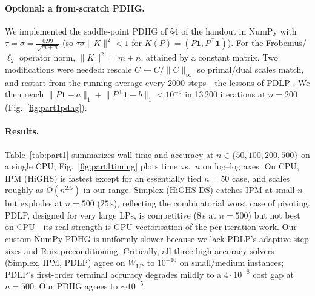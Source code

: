 \documentclass{article}
\begin{document}
\paragraph{Optional: a from-scratch PDHG.}
We implemented the saddle-point PDHG of \S4 of the handout in NumPy
with $\tau\!=\!\sigma\!=\!\tfrac{0.99}{\sqrt{m+n}}$ (so
$\tau\sigma\|K\|^2\!<\!1$ for $K(P)\!=\!(P\mathbf 1, P^{\!\top}\!\mathbf 1)$).
For the Frobenius/$\ell_2$ operator norm, $\|K\|^2\!=\!m+n$, attained
by a constant matrix.  Two modifications were needed: rescale
$C\!\leftarrow\!C/\|C\|_\infty$ so primal/dual scales match, and
restart from the running average every 2000 steps---the lessons of
PDLP \cite{applegate2021pdlp,lu2025overview}.  We then reach
$\|P\mathbf 1\!-\!a\|_1\!+\!\|P^\top\mathbf 1\!-\!b\|_1\!<\!10^{-5}$
in 13\,200 iterations at $n\!=\!200$ (Fig.~\ref{fig:part1pdhg}).

\paragraph{Results.}
Table~\ref{tab:part1} summarizes wall time and accuracy at
$n\!\in\!\{50,100,200,500\}$ on a single CPU; Fig.~\ref{fig:part1timing}
plots time vs.\ $n$ on log--log axes.
On CPU, IPM (HiGHS) is fastest except for an essentially tied $n\!=\!50$
case, and scales roughly as $O(n^{2.5})$ in our range.  Simplex (HiGHS-DS) catches IPM at small $n$
but explodes at $n\!=\!500$ ($25\,$s), reflecting the combinatorial
worst case of pivoting.  PDLP, designed for very large LPs, is
competitive (8\,s at $n\!=\!500$) but not best on CPU---its real
strength is GPU vectorisation of the per-iteration work.  Our custom
NumPy PDHG is uniformly slower because we lack PDLP's adaptive step
sizes and Ruiz preconditioning.  Critically, all three high-accuracy
solvers (Simplex, IPM, PDLP) agree on $W_{\mathrm{LP}}$ to
$10^{-10}$ on small/medium instances; PDLP's first-order terminal
accuracy degrades mildly to a $4\!\cdot\!10^{-8}$ cost gap at
$n\!=\!500$.  Our PDHG agrees to $\sim\!10^{-5}$.
\end{document}
